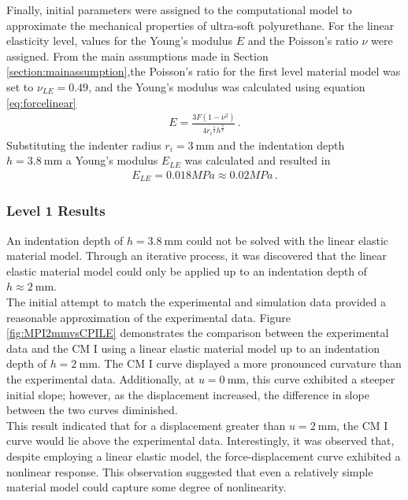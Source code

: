 Finally, initial parameters were assigned to the computational model to approximate the mechanical properties of ultra-soft polyurethane. 
For the linear elasticity level, values for the Young's modulus $E$ and the Poisson's ratio $\nu$ were assigned. 
From the main assumptions made in Section \ref{section:mainassumption},the Poisson's ratio for the first 
level material model was set to $\nu_{LE} =  0.49$, and the Young's modulus was calculated using equation \ref{eq:forcelinear}
\begin{align}
    E = \frac{3F(1-\nu^2)} {4{r_i}^{\frac{1}{2}} {h}^{\frac{3}{2}}}\, .
    \label{eq:forcelinearcp1}
\end{align}
Substituting the indenter radius $r_i = \SI{3}{\milli \meter}$ and the indentation depth $h = \SI{3.8}{\milli \meter}$ a Young's modulus $E_{LE}$ was calculated and resulted in 
\begin{align}
    E_{LE} = 0.018 MPa \approx 0.02 MPa \, .
    \label{eq:Elinearcp1}
\end{align}


\subsubsection*{Level 1 Results}
An indentation depth of $h = \SI{3.8}{\milli \meter}$ could not be solved with the linear elastic material model. 
Through an iterative process, it was discovered that the linear elastic material model could only be applied 
up to an indentation depth of $h \approx \SI{2}{\milli \meter}$.\\

The initial attempt to match the experimental and simulation data provided a reasonable approximation of the experimental data.
Figure \ref{fig:MPI2mmvsCPILE} demonstrates the comparison between the experimental data and the CM I using a 
linear elastic material model up to an indentation depth of $h = \SI{2}{\milli \meter}$. The CM I curve displayed 
a more pronounced curvature than the experimental data. Additionally, at $u =\SI{0}{\milli \meter}$, 
this curve exhibited a steeper initial slope; however, as the displacement increased, the 
difference in slope between the two curves diminished.\\

This result indicated that for a displacement greater than $u = \SI{2}{\milli \meter}$, the CM I curve would 
lie above the experimental data. Interestingly, it was observed that, despite employing a linear elastic model, 
the force-displacement curve exhibited a nonlinear response. This observation suggested that even a relatively 
simple material model could capture some degree of nonlinearity. 

